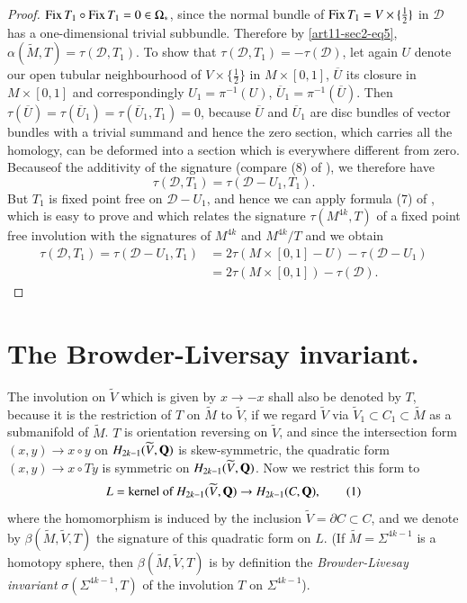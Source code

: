 \begin{proof}
$\operatorname{\mathrm{Fix}} T_{1}\circ \operatorname{\mathrm{Fix}} T_{1}=0\in \Omega_{*}$, since the normal bundle of $\operatorname{\mathrm{Fix}} T_{1}=V\times \{\frac{1}{2}\}$ in $\mathscr{D}$ has a one-dimensional trivial subbundle. Therefore by \eqref{art11-sec2-eq5}, $\alpha(\widetilde{M},T)=\tau(\mathscr{D},T_{1})$. To show that $\tau(\mathscr{D},T_{1})=-\tau(\mathscr{D})$, let again $U$ denote our open tubular neighbourhood of $V\times \{\frac{1}{2}\}$ in $M\times [0,1]$, $\overline{U}$ its closure in $M\times [0,1]$ and correspondingly $U_{1}=\pi^{-1}(U)$, $\overline{U}_{1}=\pi^{-1}(\overline{U})$. Then $\tau(\overline{U})=\tau(\overline{U}_{1})=\tau(\overline{U}_{1},T_{1})=0$, because $\overline{U}$ and $\overline{U}_{1}$ are disc bundles of vector bundles with a trivial summand and hence the zero section, which carries all the homology, can be deformed into a section which is everywhere different from zero. Because\pageoriginale of the additivity of the signature (compare (8) of \cite{art11-key7}), we therefore have
$$
\tau(\mathscr{D},T_{1})=\tau(\mathscr{D}-U_{1},T_{1}).
$$
But $T_{1}$ is fixed point free on $\mathscr{D}-U_{1}$, and hence we can apply formula (7) of \cite{art11-key7}, which is easy to prove and which relates the signature $\tau(M^{4k},T)$ of a fixed point free involution with the signatures of $M^{4k}$ and $M^{4k}/T$ and we obtain
\begin{align*}
\tau(\mathscr{D},T_{1})=\tau(\mathscr{D}-U_{1},T_{1}) &= 2\tau(M\times [0,1]-U)-\tau(\mathscr{D}-U_{1})\\[3pt]
&= 2\tau(M\times [0,1])-\tau(\mathscr{D}).
\end{align*}
\end{proof}

\section{The Browder-Liversay invariant.}\label{art11-sec3}

The involution on $\widetilde{V}$ which is given by $x\to-x$ shall also be denoted by $T$, because it is the restriction of $T$ on $\widetilde{M}$ to $\widetilde{V}$, if we regard $\widetilde{V}$ via $\widetilde{V}_{1}\subset C_{1}\subset \widetilde{M}$ as a submanifold of $\widetilde{M}$. $T$ is orientation reversing on $\widetilde{V}$, and since the intersection form $(x,y)\to x\circ y$ on $H_{2k-1}(\widetilde{V},\mathbf{Q})$ is skew-symmetric, the quadratic form $(x,y)\to x\circ Ty$ is symmetric on $H_{2k-1}(\widetilde{V},\mathbf{Q})$. Now we restrict this form to
\begin{equation*}
L=\text{kernel of } H_{2k-1}(\widetilde{V},\mathbf{Q})\to H_{2k-1}(C,\mathbf{Q}),\tag{1}\label{art11-sec3-eq1}
\end{equation*}
where the homomorphism is induced by the inclusion $\widetilde{V}=\partial C\subset C$, and we denote by $\beta(\widetilde{M},\widetilde{V},T)$ the signature of this quadratic form on $L$. (If $\widetilde{M}=\Sigma^{4k-1}$ is a homotopy sphere, then $\beta(\widetilde{M},\widetilde{V},T)$ is by definition the {\em Browder-Livesay invariant} \cite{art11-key3} $\sigma(\Sigma^{4k-1},T)$ of the involution $T$ on $\Sigma^{4k-1}$).


